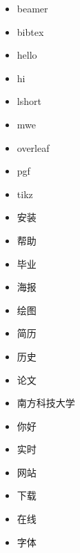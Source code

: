 \documentclass[UTF8,twocolumn]{ctexart}
\begin{document}
\begin{itemize}
  \item beamer
  \item bibtex
  \item hello
  \item hi
  \item lshort
  \item mwe
  \item overleaf
  \item pgf
  \item tikz
  \item 安装
  \item 帮助
  \item 毕业
  \item 海报
  \item 绘图
  \item 简历
  \item 历史
  \item 论文
  \item 南方科技大学
  \item 你好
  \item 实时
  \item 网站
  \item 下载
  \item 在线
  \item 字体
\end{itemize}
\end{document}
